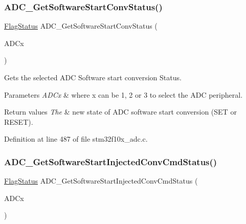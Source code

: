 \subsubsection{\texorpdfstring{A\+D\+C\+\_\+\+Get\+Software\+Start\+Conv\+Status()}{ADC\_GetSoftwareStartConvStatus()}}
{\footnotesize\ttfamily \hyperlink{group___exported__types_ga89136caac2e14c55151f527ac02daaff}{Flag\+Status} A\+D\+C\+\_\+\+Get\+Software\+Start\+Conv\+Status (\begin{DoxyParamCaption}\item[{\hyperlink{struct_a_d_c___type_def}{A\+D\+C\+\_\+\+Type\+Def} $\ast$}]{A\+D\+Cx }\end{DoxyParamCaption})}



Gets the selected A\+DC Software start conversion Status. 


\begin{DoxyParams}{Parameters}
{\em A\+D\+Cx} & where x can be 1, 2 or 3 to select the A\+DC peripheral. \\
\hline
\end{DoxyParams}

\begin{DoxyRetVals}{Return values}
{\em The} & new state of A\+DC software start conversion (S\+ET or R\+E\+S\+ET). \\
\hline
\end{DoxyRetVals}


Definition at line 487 of file stm32f10x\+\_\+adc.\+c.

\mbox{\label{group___a_d_c___exported___functions_ga8765f8835b8cfed13dce3d8d71767dcc}} 
\subsubsection{\texorpdfstring{A\+D\+C\+\_\+\+Get\+Software\+Start\+Injected\+Conv\+Cmd\+Status()}{ADC\_GetSoftwareStartInjectedConvCmdStatus()}}
{\footnotesize\ttfamily \hyperlink{group___exported__types_ga89136caac2e14c55151f527ac02daaff}{Flag\+Status} A\+D\+C\+\_\+\+Get\+Software\+Start\+Injected\+Conv\+Cmd\+Status (\begin{DoxyParamCaption}\item[{\hyperlink{struct_a_d_c___type_def}{A\+D\+C\+\_\+\+Type\+Def} $\ast$}]{A\+D\+Cx }\end{DoxyParamCaption})}



